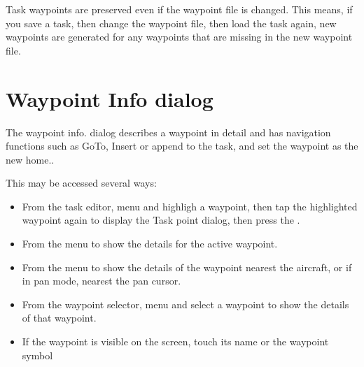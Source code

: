 Task waypoints are preserved even if the waypoint
file is changed.  This means, if you save a task, then change the
waypoint file, then load the task again, new waypoints are generated
for any waypoints that are missing in the new waypoint file.

\section{Waypoint Info dialog}

The waypoint info. dialog describes a waypoint in detail and has
navigation functions such as GoTo, Insert or append to the task, and set the waypoint as the new home..

This may be accessed several ways:
\begin{itemize}
\item
From the task editor, menu \blink{}\blink{}
and highligh a waypoint, then tap the highlighted waypoint again to display the Task point dialog, then press the  \InfoBox.

\item 
From the menu \blink{} to show the
details for the active waypoint.

\item
From the menu \blink{} to show the
details of the waypoint nearest the aircraft, or if in pan mode,
nearest the pan cursor.

\item
From the waypoint selector, menu \blink{} and select a waypoint to show the details of that waypoint.

\item
If the waypoint is visible on the screen, touch its name or the waypoint symbol


\end{itemize}

